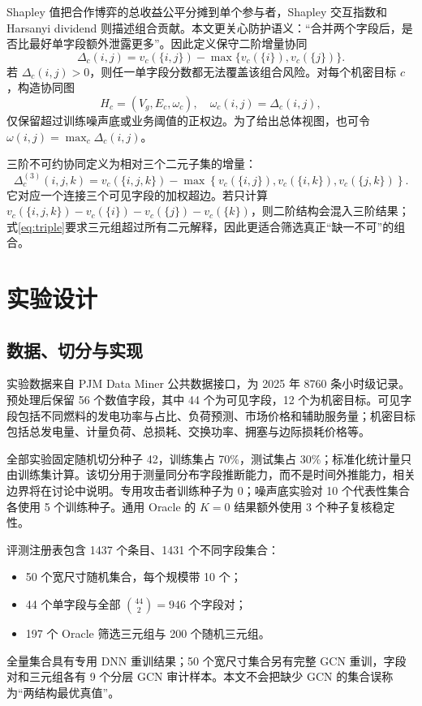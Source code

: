 \documentclass[UTF8,a4paper,zihao=5,fontset=fandol]{ctexart}
\begin{document}
Shapley 值把合作博弈的总收益公平分摊到单个参与者\citep{shapley1953value}，Shapley 交互指数和 Harsanyi dividend 则描述组合贡献\citep{harsanyi1963bargaining,grabisch1999interaction}。本文更关心防护语义：“合并两个字段后，是否比最好单字段额外泄露更多”。因此定义保守二阶增量协同
\begin{equation}
  \Delta_c(i,j)=v_c(\{i,j\})
  -\max\{v_c(\{i\}),v_c(\{j\})\}.
  \label{eq:pair}
\end{equation}
若 $\Delta_c(i,j)>0$，则任一单字段分数都无法覆盖该组合风险。对每个机密目标 $c$，构造协同图
\begin{equation}
  H_c=(V_g,E_c,\omega_c),\quad
  \omega_c(i,j)=\Delta_c(i,j),
\end{equation}
仅保留超过训练噪声底或业务阈值的正权边。为了给出总体视图，也可令 $\omega(i,j)=\max_c\Delta_c(i,j)$。

三阶不可约协同定义为相对三个二元子集的增量：
\begin{equation}
  \Delta_c^{(3)}(i,j,k)
  =
  v_c(\{i,j,k\})-
  \max\left\{
  v_c(\{i,j\}),v_c(\{i,k\}),v_c(\{j,k\})
  \right\}.
  \label{eq:triple}
\end{equation}
它对应一个连接三个可见字段的加权超边。若只计算 $v_c(\{i,j,k\})-v_c(\{i\})-v_c(\{j\})-v_c(\{k\})$，则二阶结构会混入三阶结果；式\eqref{eq:triple}要求三元组超过所有二元解释，因此更适合筛选真正“缺一不可”的组合。

\section{实验设计}

\subsection{数据、切分与实现}

实验数据来自 PJM Data Miner 公共数据接口\citep{pjmdataminer}，为 2025 年 8760 条小时级记录。预处理后保留 56 个数值字段，其中 44 个为可见字段，12 个为机密目标。可见字段包括不同燃料的发电功率与占比、负荷预测、市场价格和辅助服务量；机密目标包括总发电量、计量负荷、总损耗、交换功率、拥塞与边际损耗价格等。

全部实验固定随机切分种子 42，训练集占 70\%，测试集占 30\%；标准化统计量只由训练集计算。该切分用于测量同分布字段推断能力，而不是时间外推能力，相关边界将在讨论中说明。专用攻击者训练种子为 0；噪声底实验对 10 个代表性集合各使用 5 个训练种子。通用 Oracle 的 $K=0$ 结果额外使用 3 个种子复核稳定性。

评测注册表包含 1437 个条目、1431 个不同字段集合：
\begin{itemize}
  \item 50 个宽尺寸随机集合，每个规模带 10 个；
  \item 44 个单字段与全部 $\binom{44}{2}=946$ 个字段对；
  \item 197 个 Oracle 筛选三元组与 200 个随机三元组。
\end{itemize}
全量集合具有专用 DNN 重训结果；50 个宽尺寸集合另有完整 GCN 重训，字段对和三元组各有 9 个分层 GCN 审计样本。本文不会把缺少 GCN 的集合误称为“两结构最优真值”。
\end{document}
